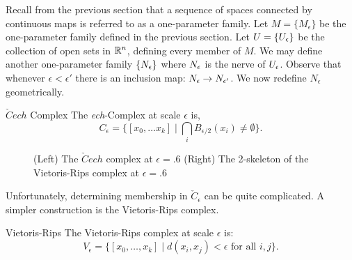 Recall from the previous section that a sequence of spaces connected by continuous maps is referred to as a one-parameter family. Let $M = \{M_\epsilon\}$ be the one-parameter family defined in the previous section. Let $U = \{U_\epsilon\}$ be the collection of open sets in $\mathbb{R}^n$, defining every member of $M$. We may define another one-parameter family $\{ N_\epsilon \}$ where $N_\epsilon$ is the nerve of $U_\epsilon$. Observe that whenever $\epsilon < \epsilon'$ there is an inclusion map: $N_\epsilon \rightarrow N_{\epsilon'}$.
We now redefine $N_{\epsilon}$ geometrically.
\begin{definition}{$\check{C}ech$ Complex}
The \emph{ech}-Complex at scale $\epsilon$ is,
\[ C_\epsilon = \{ [ x_0, \ldots x_k] \mid \bigcap_i B_{\epsilon/2}(x_i)  \neq \emptyset \}. \]
\end{definition}
\begin{figure}
\centering
 \hspace{1cm}
\caption{(Left) The $\check{C}ech$ complex at $\epsilon = .6$ (Right) The 2-skeleton of the Vietoris-Rips complex at $\epsilon = .6$ }
\label{fig:c-and-r}
\end{figure}
Unfortunately, determining membership in $\check{C}_\epsilon$ can be quite complicated. A simpler construction is the 
Vietoris-Rips complex.
\begin{definition}{Vietoris-Rips}
The Vietoris-Rips complex at scale $\epsilon$ is:
\[ V_\epsilon = \{ [x_0, \ldots, x_k] \mid d(x_i, x_j) < \epsilon \textrm{ for all } i,j  \}. \]
\end{definition}
